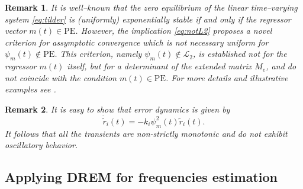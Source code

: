 \documentclass[journal, onecolumn]{IEEEtran}
\newtheorem{remark}{Remark}
\begin{document}
\begin{remark}
It is well--known \cite{sastry2011adaptive} that the zero equilibrium of the linear time--varying system \eqref{eq:tilder} is (uniformly) exponentially stable if and only if the regressor vector $m(t)\in\mbox{PE}$. However, the implication \eqref{eq:notL2} proposes a novel criterion for \emph{assymptotic} convergence which is not necessary uniform for $\psi_m(t) \notin \mbox{PE}$. This criterion, namely $	\psi_m(t) \notin \mathcal{L}_2$, is established not for the regressor $m(t)$ itself, but for a determinant of the extended matrix $M_e$, and do not coincide with the condition $m(t)\in\mbox{PE}$. For more details and illustrative examples see \cite{Aranovskiy2015DREM}.
\end{remark}

\begin{remark} \label{rem:mono}
It is easy to show that error dynamics is given by
\[
	\dot{\tilde {r}}_i(t) = -k_i \psi_m^2(t)\tilde{r}_i(t).
\]
It follows that all the transients are \emph{non-strictly monotonic} and do not exhibit oscillatory behavior. 
\end{remark}

\subsection{Applying DREM for frequencies estimation}
\end{document}
